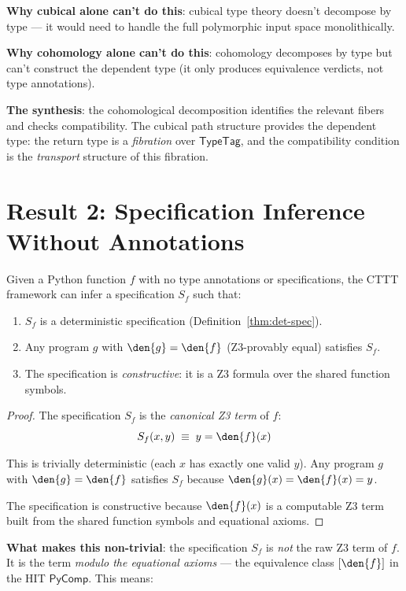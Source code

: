 \textbf{Why cubical alone can't do this}: cubical type theory doesn't
decompose by type --- it would need to handle the full polymorphic
input space monolithically.

\textbf{Why cohomology alone can't do this}: cohomology decomposes
by type but can't construct the dependent type (it only produces
equivalence verdicts, not type annotations).

\textbf{The synthesis}: the cohomological decomposition identifies the
relevant fibers and checks compatibility.  The cubical path structure
provides the dependent type: the return type is a \emph{fibration}
over $\mathsf{TypeTag}$, and the compatibility condition is the
\emph{transport} structure of this fibration.

\section{Result 2: Specification Inference Without Annotations}

\begin{theorem}
\label{thm:spec-infer}
Given a Python function $f$ with no type annotations or specifications,
the CTTT framework can infer a specification $S_f$ such that:
\begin{enumerate}
  \item $S_f$ is a deterministic specification (Definition~\ref{thm:det-spec}).
  \item Any program $g$ with $\den{g} = \den{f}$ (Z3-provably equal)
    satisfies $S_f$.
  \item The specification is \emph{constructive}: it is a Z3 formula
    over the shared function symbols.
\end{enumerate}
\end{theorem}

\begin{proof}
The specification $S_f$ is the \emph{canonical Z3 term} of $f$:
\[
  S_f(x, y) \;\equiv\; y = \den{f}(x)
\]

This is trivially deterministic (each $x$ has exactly one valid $y$).
Any program $g$ with $\den{g} = \den{f}$ satisfies $S_f$ because
$\den{g}(x) = \den{f}(x) = y$.

The specification is constructive because $\den{f}(x)$ is a computable
Z3 term built from the shared function symbols and equational axioms.
\end{proof}

\textbf{What makes this non-trivial}: the specification $S_f$ is
\emph{not} the raw Z3 term of $f$.  It is the term \emph{modulo the
equational axioms} --- the equivalence class $[\den{f}]$ in the HIT
$\mathsf{PyComp}$.  This means:

